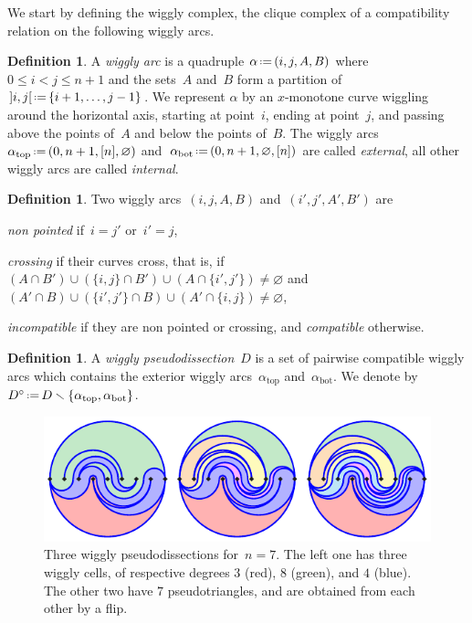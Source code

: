 \documentclass[submission]{FPSAC2025}
\theoremstyle{definition}
\newtheorem{definition}[theorem]{Definition}
\newcommand{\ssm}{\smallsetminus} %
\newcommand{\eqdef}{\mbox{\,\raisebox{0.2ex}{\scriptsize\ensuremath{\mathrm:}}\ensuremath{=}\,}} %
\newcommand{\darkblue}{\color{darkblue}} %
\newcommand{\defn}[1]{\textsl{\darkblue #1}} %
\begin{document}
We start by defining the wiggly complex, the clique complex of a compatibility relation on the following wiggly arcs.

\begin{definition}
A \defn{wiggly arc} is a quadruple $\alpha \eqdef (i,j,A,B)$ where $0 \!\le\! i \!<\! j \!\le\! n+1$ and the sets~$A$ and~$B$ form a partition of~${]i,j[} \eqdef \{i+1, \dots, j-1\}$.
We represent $\alpha$ by an $x$-monotone curve wiggling around the horizontal axis, starting at point~$i$, ending at point~$j$, and passing above the points of~$A$ and below the points of~$B$.
The wiggly arcs~$\alpha_\mathrm{top} \eqdef (0, n+1, [n], \varnothing)$ and~$\alpha_\mathrm{bot} \eqdef (0, n+1, \varnothing, [n])$ are called \defn{external}, all other wiggly arcs are called \defn{internal}.
\end{definition}

\begin{definition}
\label{def:compatible}
Two wiggly arcs~$(i,j,A,B)$ and~$(i',j',A',B')$ are 
\begin{compactitem}
\item \defn{non pointed} if~$i = j'$ or~$i' = j$,
\item \defn{crossing} if their curves cross, that is, if $(A \cap B') \cup (\{i,j\} \cap B') \cup (A \cap \{i',j'\}) \ne \varnothing$ and $(A' \cap B) \cup (\{i',j'\} \cap B) \cup (A' \cap \{i,j\})\ne \varnothing$,
\item \defn{incompatible} if they are non pointed or crossing, and \defn{compatible} otherwise.
\end{compactitem}
%
\end{definition}

\begin{definition}
A \defn{wiggly pseudodissection}~$D$ is a set of pairwise compatible wiggly arcs which contains the exterior wiggly arcs~$\alpha_\mathrm{top}$ and~$\alpha_\mathrm{bot}$. We denote by~$D^\circ \eqdef D \ssm \{\alpha_\mathrm{top}, \alpha_\mathrm{bot}\}$.

\begin{figure}[b]
\centerline{\includegraphics[scale=1.4]{wigglyPseudodissections}}
\caption{Three wiggly pseudodissections for~$n = 7$. The left one has three wiggly cells, of respective degrees $3$ (red), $8$ (green), and $4$ (blue). The other two have $7$ pseudotriangles, and are obtained from each other by a flip.}
\label{fig:pseudodissections}
\end{figure}
\end{definition}
\end{document}
